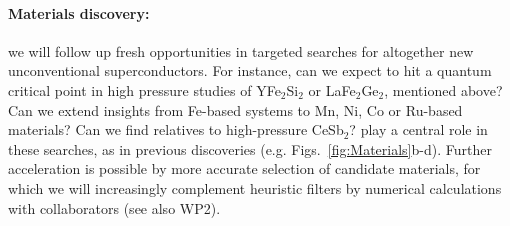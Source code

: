 \paragraph{Materials discovery:}
we will follow up fresh opportunities in targeted searches for altogether new unconventional superconductors. %
For instance, can we expect to hit a quantum critical point in high pressure studies of YFe$_2$Si$_2$ or LaFe$_2$Ge$_2$, mentioned above? Can we extend insights from Fe-based systems to Mn, Ni, Co or Ru-based materials? Can we find relatives to high-pressure CeSb$_2$? 
 play a central role in these searches, as in previous discoveries (e.g. Figs.~\ref{fig:Materials}b-d). %
Further acceleration is possible  by more accurate selection of candidate materials, for which we will increasingly complement heuristic filters by numerical calculations with collaborators (see also WP2).  






\\
\\

\vspace{-1em}
